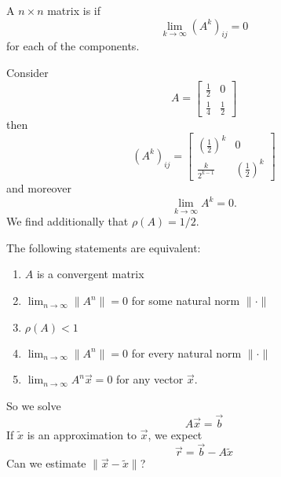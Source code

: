 \begin{defn}
A $n\times n$ matrix is  if 
\begin{equation}
\lim_{k\to\infty}(A^{k})_{ij}=0
\end{equation}
for each of the components.
\end{defn}
\begin{ex}
Consider
\begin{equation}
A=\begin{bmatrix}
\frac{1}{2} & 0\\
\frac{1}{4} & \frac{1}{2}
\end{bmatrix}
\end{equation}
then
\begin{equation}
(A^{k})_{ij}=\begin{bmatrix}
(\frac{1}{2})^{k} & 0\\
\frac{k}{2^{k-1}} & (\frac{1}{2})^{k}
\end{bmatrix}
\end{equation}
and moreover
\begin{equation}
\lim_{k\to\infty}A^{k}=0.
\end{equation}
We find additionally that $\rho(A)=1/2$.
\end{ex}
\begin{thm}
The following statements are equivalent:
\begin{enumerate}
\item $A$ is a convergent matrix
\item $\displaystyle{\lim_{n\to\infty}\|A^{n}\|=0}$ for some natural
  norm $\|\cdot\|$
\item $\rho(A)<1$
\item $\displaystyle{\lim_{n\to\infty}\|A^{n}\|=0}$ for every natural
  norm $\|\cdot\|$
\item $\displaystyle{\lim_{n\to\infty}A^{n}\vec{x}=0}$ for any vector $\vec{x}$.
\end{enumerate}
\end{thm}

So we solve
\begin{equation}
A\vec{x}=\vec{b}
\end{equation}
If $\widetilde{x}$ is an approximation to $\vec{x}$, we expect
\begin{equation}
\vec{r}=\vec{b}-A\widetilde{x}
\end{equation}
Can we estimate $\|\vec{x}-\widetilde{x}\|$? 
